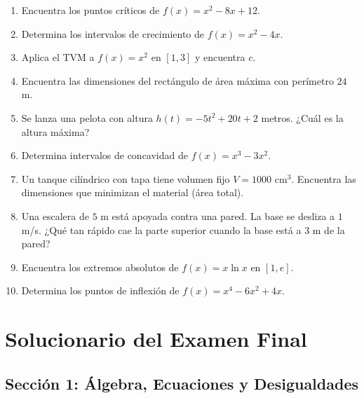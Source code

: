\documentclass[12pt, a4paper]{article}
\begin{document}
\begin{enumerate}[leftmargin=*, resume]
  \item \facil{} Encuentra los puntos críticos de $f(x) = x^2 - 8x + 12$.

  \item \facil{} Determina los intervalos de crecimiento de $f(x) = x^2 - 4x$.

  \item \facil{} Aplica el TVM a $f(x) = x^2$ en $[1, 3]$ y encuentra $c$.

  \item \medio{} Encuentra las dimensiones del rectángulo de área máxima con perímetro $24$ m.

  \item \medio{} Se lanza una pelota con altura $h(t) = -5t^2 + 20t + 2$ metros. ¿Cuál es la altura máxima?

  \item \medio{} Determina intervalos de concavidad de $f(x) = x^3 - 3x^2$.

  \item \dificil{} Un tanque cilíndrico con tapa tiene volumen fijo $V = 1000$ cm$^3$. Encuentra las dimensiones que minimizan el material (área total).

  \item \dificil{} Una escalera de $5$ m está apoyada contra una pared. La base se desliza a $1$ m/s. ¿Qué tan rápido cae la parte superior cuando la base está a $3$ m de la pared?

  \item \dificil{} Encuentra los extremos absolutos de $f(x) = x \ln x$ en $[1, e]$.

  \item \dificil{} Determina los puntos de inflexión de $f(x) = x^4 - 6x^2 + 4x$.
\end{enumerate}

\newpage

\section{Solucionario del Examen Final}

\subsection*{Sección 1: Álgebra, Ecuaciones y Desigualdades}
\end{document}
